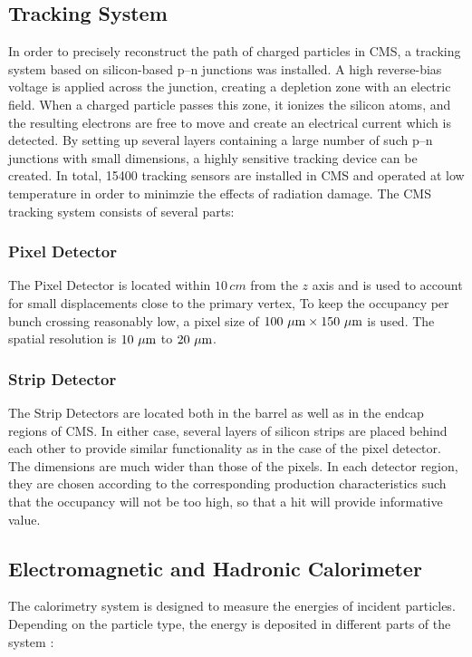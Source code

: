 \subsection{Tracking System}
In order to precisely reconstruct the path of charged particles in CMS, a tracking system based on silicon-based p--n junctions was installed. A high reverse-bias voltage is applied across the junction, creating a depletion zone with an electric field. When a charged particle passes this zone, it ionizes the silicon atoms, and the resulting electrons are free to move and create an electrical current which is detected. By setting up several layers containing a large number of such p--n junctions with small dimensions, a highly sensitive tracking device can be created. In total, 15400 tracking sensors are installed in CMS and operated at low temperature in order to minimzie the effects of radiation damage. The CMS tracking system consists of several parts:

\subsubsection*{Pixel Detector}
The Pixel Detector is located within $10\,\unit{cm}$ from the $z$ axis and is used to account for small displacements close to the primary vertex, To keep the occupancy per bunch crossing reasonably low, a pixel size of $100\,\,\mu\text{m} \times 150\,\,\mu\text{m}$ is used. The spatial resolution is $10\,\,\mu\text{m}$ to $20\,\,\mu\text{m}$.

\subsubsection*{Strip Detector}
The Strip Detectors are located both in the barrel as well as in the endcap regions of CMS. In either case, several layers of silicon strips are placed behind each other to provide similar functionality as in the case of the pixel detector. The dimensions are much wider than those of the pixels. In each detector region, they are chosen according to the corresponding production characteristics such that the occupancy will not be too high, so that a hit will provide informative value.

\subsection{Electromagnetic and Hadronic Calorimeter}
The calorimetry system is designed to measure the energies of incident particles. Depending on the particle type, the energy is deposited in different parts of the system \cite{EvaHalkiadakis}:

